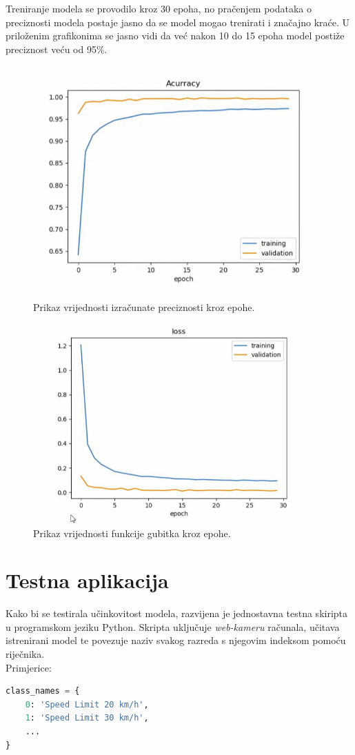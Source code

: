 \documentclass[times, utf8, zavrsni]{fer}
\begin{document}
Treniranje modela se provodilo kroz 30 epoha, no pračenjem podataka o preciznosti modela postaje jasno da se model mogao trenirati i značajno kraće.
U priloženim grafikonima se jasno vidi da već nakon 10 do 15 epoha model postiže preciznost veću od 95\%.
\begin{figure}[h!]
  \includegraphics[width=\linewidth,trim=4 4 4 4,clip]{images/acc_plot.jpeg}
  \caption{Prikaz vrijednosti izračunate preciznosti kroz epohe.}
  \includegraphics[width=\linewidth,trim=4 4 4 4,clip]{images/loss_plot.jpeg}
  \caption{Prikaz vrijednosti funkcije gubitka kroz epohe.}
\end{figure} 

\pagebreak
\section{Testna aplikacija}
Kako bi se testirala učinkovitost modela, razvijena je jednostavna testna skiripta u programskom jeziku Python. Skripta uključuje  \emph{web-kameru} računala, učitava istrenirani model te povezuje naziv svakog razreda s njegovim indeksom pomoću riječnika.
\\Primjerice:
\begin{lstlisting}[language=Python]
class_names = {
    0: 'Speed Limit 20 km/h',
    1: 'Speed Limit 30 km/h',
    ...
}
\end{lstlisting}
\end{document}
